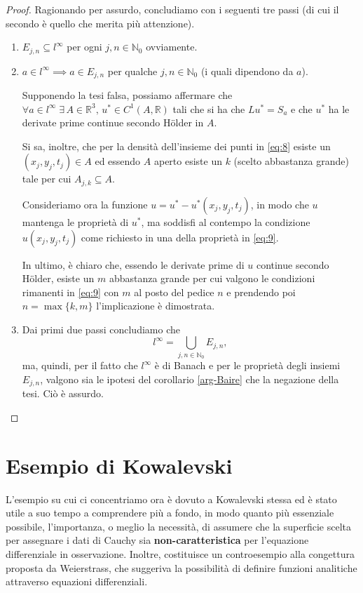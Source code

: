 \begin{proof}
Ragionando per assurdo, concludiamo con i seguenti tre passi (di cui il secondo è quello che merita più attenzione).
\begin{enumerate}
\item
$E_{j,n} \subseteq l^{\infty} $ per ogni $j,n \in \mathbb{N}_0$ ovviamente.
\item
$a \in l^{\infty} \implies a \in E_{j,n}$ per qualche $j,n \in \mathbb{N}_0$ (i quali  dipendono da $a$).

Supponendo la tesi falsa, possiamo affermare che $\forall a \in l^\infty \; \exists \, A \in \mathbb{R}^3, \, u^* \in C^1(A,\mathbb{R})$ tali che si ha che $Lu^*=S_a$ e che $u^*$ ha le derivate prime continue secondo Hölder in $A$.

Si sa, inoltre, che per la densità dell'insieme dei punti in \eqref{eq:8} esiste un $(x_j,y_j,t_j) \in A$ ed essendo $A$ aperto esiste un $k$ (scelto abbastanza grande) tale per cui $A_{j,k} \subseteq A$.

Consideriamo ora la funzione $u=u^*-u^*(x_j,y_j,t_j)$, in modo che $u$ mantenga le proprietà di $u^*$, ma soddisfi al contempo la condizione $u(x_j,y_j,t_j)$ come richiesto in una della proprietà in \eqref{eq:9}.

In ultimo, è chiaro che, essendo le derivate prime di $u$ continue secondo Hölder, esiste un $m$ abbastanza grande per cui valgono le condizioni rimanenti in \eqref{eq:9} con $m$ al posto del pedice $n$ e prendendo poi $n=\max\{k,m\}$ l'implicazione è dimostrata.

\item
Dai primi due passi concludiamo che $$l^{\infty}=\bigcup\limits_{j,n \in \mathbb{N}_0}E_{j,n},$$ ma, quindi, per il fatto che $l^{\infty}$ è di Banach e per le proprietà degli insiemi $E_{j,n}$, valgono sia le ipotesi del corollario \ref{arg-Baire} che la negazione della tesi. Ciò è assurdo.
\end{enumerate}
\end{proof}


\newpage
\section{Esempio di Kowalevski}

L'esempio su cui ci concentriamo ora è dovuto a Kowalevski stessa ed è stato utile a suo tempo a comprendere più a fondo, in modo quanto più essenziale possibile, l'importanza, o meglio la necessità, di assumere che la superficie scelta per assegnare i dati di Cauchy sia \textbf{non-caratteristica} per l'equazione differenziale in osservazione. Inoltre, costituisce un controesempio alla congettura proposta da Weierstrass, che suggeriva la possibilità di definire funzioni analitiche attraverso equazioni differenziali. 

